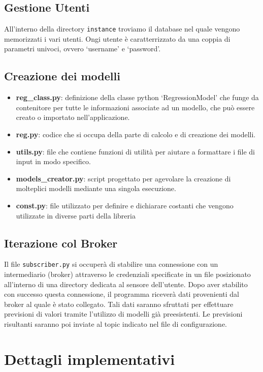 \documentclass[a4paper,10pt]{article}
\begin{document}
\subsection{Gestione Utenti}
All'interno della directory \texttt{instance} troviamo il database nel quale vengono memorizzati i vari utenti. Ongi utente è caratterrizzato
da una coppia di parametri univoci, ovvero `username' e `password'. 

\subsection{Creazione dei modelli}
\begin{itemize}
  \item \textbf{reg\_class.py}: definizione della classe python `RegressionModel' che funge da contenitore per tutte le
  informazioni associate ad un modello, che può essere creato o importato nell'applicazione.
  \item \textbf{reg.py}: codice che si occupa della parte di calcolo e di creazione dei modelli.
  \item \textbf{utils.py}: file che contiene funzioni di utilità per aiutare a formattare i file di input in modo specifico.
  \item \textbf{models\_creator.py}: script progettato per agevolare la creazione di molteplici modelli mediante una singola esecuzione.
  \item \textbf{const.py}: file utilizzato per definire e dichiarare costanti che vengono utilizzate in diverse parti della libreria
\end{itemize}

\subsection{Iterazione col Broker}
Il file \texttt{subscriber.py} si occuperà di stabilire una connessione con un intermediario (broker) attraverso le credenziali specificate in 
un file posizionato all'interno di una directory dedicata al sensore dell'utente. Dopo aver stabilito con successo questa connessione, il programma riceverà 
dati provenienti dal broker al quale è stato collegato. Tali dati saranno sfruttati per effettuare previsioni di valori tramite l'utilizzo di modelli già preesistenti. 
Le previsioni risultanti saranno poi inviate al topic indicato nel file di configurazione.


\section{Dettagli implementativi}
\end{document}
